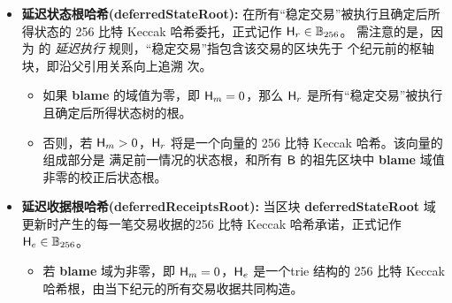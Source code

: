 \begin{itemize}[nosep]
	\item {\bf 延迟状态根哈希(deferredStateRoot):} 在所有“稳定交易”被执行且确定后所得状态的 256 比特 Keccak 哈希委托，正式记作 $\textsf{H}_r\in\mathbb{B}_{256}$。
	需注意的是，因为 {\name} 的 \emph{延迟执行} 规则，“稳定交易”指包含该交易的区块先于  个纪元前的枢轴块，即沿父引用关系向上追溯  次。
	\begin{itemize}
		\item 如果 {\bf blame} 的域值为零，即 $\textsf{H}_m=0$，那么 $\textsf{H}_r$ 是所有“稳定交易”被执行且确定后所得状态树的根。
	
		\item 否则，若 $\textsf{H}_m>0$，$\textsf{H}_r$ 将是一个向量的 256 比特 Keccak 哈希。该向量的组成部分是 满足前一情况的状态根，和所有 $\textsf{B}$ 的祖先区块中 {\bf blame} 域值非零的校正后状态根。
	\end{itemize}
	
	
	\item {\bf 延迟收据根哈希(deferredReceiptsRoot):} 当区块 {\bf deferredStateRoot} 域更新时产生的每一笔交易收据的256 比特 Keccak 哈希承诺，正式记作 $\textsf{H}_e\in\mathbb{B}_{256}$。
	\begin{itemize}
		\item 若 {\bf blame} 域为非零，即 $\textsf{H}_m=0$，$\textsf{H}_e$ 是一个trie 结构的 256 比特 Keccak 哈希根，由当下纪元的所有交易收据共同构造。
		

\end{itemize}
\end{itemize}

